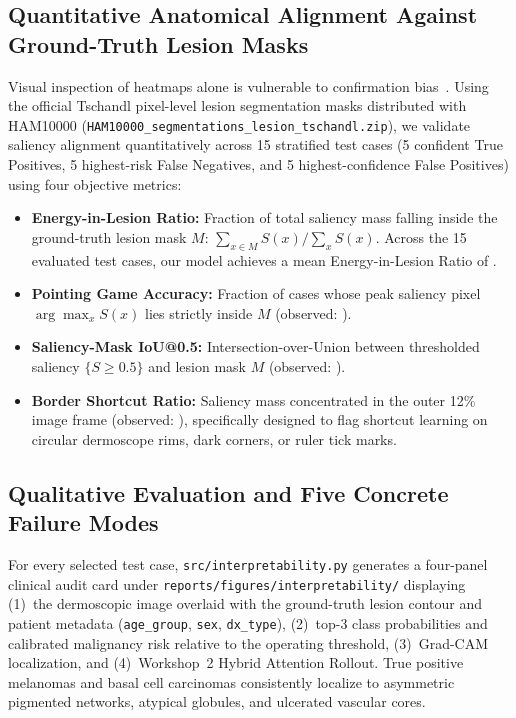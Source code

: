 \subsection{Quantitative Anatomical Alignment Against Ground-Truth Lesion Masks}
Visual inspection of heatmaps alone is vulnerable to confirmation bias~\cite{Ghassemi2021false}. Using the official Tschandl pixel-level lesion segmentation masks distributed with HAM10000 (\texttt{HAM10000\_segmentations\_lesion\_tschandl.zip}), we validate saliency alignment quantitatively across 15 stratified test cases (5 confident True Positives, 5 highest-risk False Negatives, and 5 highest-confidence False Positives) using four objective metrics:
\begin{itemize}
  \item \textbf{Energy-in-Lesion Ratio:} Fraction of total saliency mass falling inside the ground-truth lesion mask $M$: $\sum_{x\in M} S(x) / \sum_x S(x)$. Across the 15 evaluated test cases, our model achieves a mean Energy-in-Lesion Ratio of \WSixXaiLesionEnergy{}.
  \item \textbf{Pointing Game Accuracy:} Fraction of cases whose peak saliency pixel $\arg\max_x S(x)$ lies strictly inside $M$ (observed: \WSixXaiPointingAcc{}).
  \item \textbf{Saliency-Mask IoU@0.5:} Intersection-over-Union between thresholded saliency $\{S \ge 0.5\}$ and lesion mask $M$ (observed: \WSixXaiIoU{}).
  \item \textbf{Border Shortcut Ratio:} Saliency mass concentrated in the outer 12\% image frame (observed: \WSixXaiBorderEnergy{}), specifically designed to flag shortcut learning on circular dermoscope rims, dark corners, or ruler tick marks.
\end{itemize}

\subsection{Qualitative Evaluation and Five Concrete Failure Modes}
For every selected test case, \texttt{src/interpretability.py} generates a four-panel clinical audit card under \texttt{reports/figures/interpretability/} displaying (1)~the dermoscopic image overlaid with the ground-truth lesion contour and patient metadata (\texttt{age\_group}, \texttt{sex}, \texttt{dx\_type}), (2)~top-3 class probabilities and calibrated malignancy risk relative to the operating threshold, (3)~Grad-CAM localization, and (4)~Workshop~2 Hybrid Attention Rollout. True positive melanomas and basal cell carcinomas consistently localize to asymmetric pigmented networks, atypical globules, and ulcerated vascular cores.

